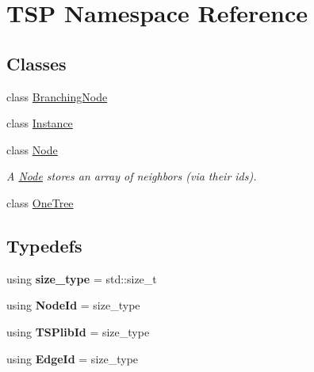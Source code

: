 \hypertarget{namespaceTSP}{}\section{T\+SP Namespace Reference}
\label{namespaceTSP}
\subsection*{Classes}
\begin{DoxyCompactItemize}
\item 
class \hyperlink{classTSP_1_1BranchingNode}{Branching\+Node}
\item 
class \hyperlink{classTSP_1_1Instance}{Instance}
\item 
class \hyperlink{classTSP_1_1Node}{Node}
\begin{DoxyCompactList}\small\item\em A {\ttfamily \hyperlink{classTSP_1_1Node}{Node}} stores an array of neighbors (via their ids). \end{DoxyCompactList}\item 
class \hyperlink{classTSP_1_1OneTree}{One\+Tree}
\end{DoxyCompactItemize}
\subsection*{Typedefs}
\begin{DoxyCompactItemize}
\item 
\mbox{\label{namespaceTSP_a22c299cf14e03937cb4063ed1caa4320}} 
using {\bfseries size\+\_\+type} = std\+::size\+\_\+t
\item 
\mbox{\label{namespaceTSP_afee6b1f23d95a5d2bd45d7b5eba2ffb0}} 
using {\bfseries Node\+Id} = size\+\_\+type
\item 
\mbox{\label{namespaceTSP_a6bfafd5061695c2f67ce234440bf6b15}} 
using {\bfseries T\+S\+Plib\+Id} = size\+\_\+type
\item 
\mbox{\label{namespaceTSP_a3309ca2acc192768a0309bc5d7b2d101}} 
using {\bfseries Edge\+Id} = size\+\_\+type
\end{DoxyCompactItemize}
